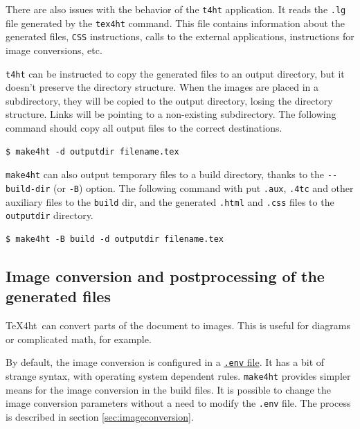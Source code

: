 \label{sec:output-dir}

There are also issues with the behavior of the \texttt{t4ht}
application. It reads the \texttt{.lg} file generated by the
\texttt{tex4ht} command. This file contains information about the
generated files, \texttt{CSS} instructions, calls to the external
applications, instructions for image conversions, etc.

\texttt{t4ht} can be instructed to copy the generated files to an output
directory, but it doesn't preserve the directory structure. When the
images are placed in a\\
subdirectory, they will be copied to the output directory, losing the
directory structure. Links will be pointing to a non-existing
subdirectory. The following command should copy all output files to the
correct destinations.

\begin{verbatim}
$ make4ht -d outputdir filename.tex
\end{verbatim}

\texttt{make4ht} can also output temporary files to a build directory,
thanks to the \texttt{-\/-build-dir} (or \texttt{-B}) option. The
following command with put \texttt{.aux}, \texttt{.4tc} and other
auxiliary files to the \texttt{build} dir, and the generated
\texttt{.html} and \texttt{.css} files to the \texttt{outputdir}
directory.

\begin{verbatim}
$ make4ht -B build -d outputdir filename.tex
\end{verbatim}

\subsection{Image conversion and postprocessing of the generated
files}\label{image-conversion-and-postprocessing-of-the-generated-files}

\TeX4ht~can convert parts of the document to images. This is useful for
diagrams or complicated math, for example.

By default, the image conversion is configured in a
\href{https://www.tug.org/applications/tex4ht/mn34.html\#mn35.html}{\texttt{.env}
file}. It has a bit of strange syntax, with operating system dependent
rules. \texttt{make4ht} provides simpler means for the image conversion
in the build files. It is possible to change the image conversion
parameters without a need to modify the \texttt{.env} file. The process
is described in section \ref{sec:imageconversion}.

